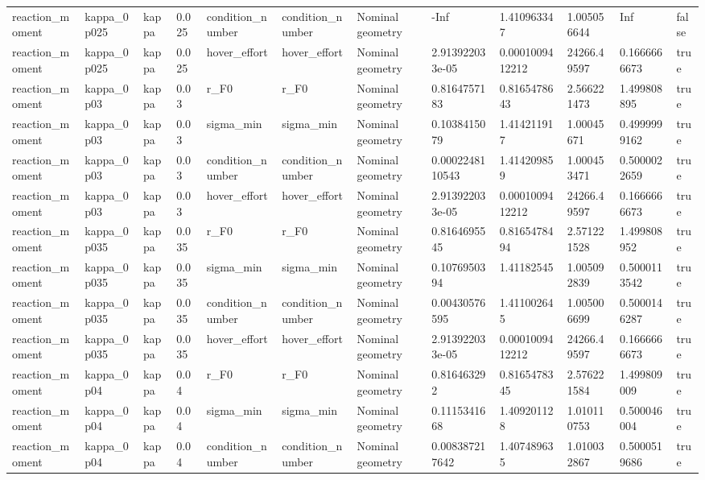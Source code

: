 \begin{tabular}{@{}llllllllllll@{}}
reaction\_moment & kappa\_0p025 & kappa & 0.025 & condition\_number & condition\_number & Nominal geometry & -Inf & 1.410963347 & 1.005056644 & Inf & false \\
reaction\_moment & kappa\_0p025 & kappa & 0.025 & hover\_effort & hover\_effort & Nominal geometry & 2.913922033e-05 & 0.0001009412212 & 24266.49597 & 0.1666666673 & true \\
reaction\_moment & kappa\_0p03 & kappa & 0.03 & r\_F0 & r\_F0 & Nominal geometry & 0.8164757183 & 0.8165478643 & 2.566221473 & 1.499808895 & true \\
reaction\_moment & kappa\_0p03 & kappa & 0.03 & sigma\_min & sigma\_min & Nominal geometry & 0.1038415079 & 1.414211917 & 1.00045671 & 0.4999999162 & true \\
reaction\_moment & kappa\_0p03 & kappa & 0.03 & condition\_number & condition\_number & Nominal geometry & 0.0002248110543 & 1.414209859 & 1.000453471 & 0.5000022659 & true \\
reaction\_moment & kappa\_0p03 & kappa & 0.03 & hover\_effort & hover\_effort & Nominal geometry & 2.913922033e-05 & 0.0001009412212 & 24266.49597 & 0.1666666673 & true \\
reaction\_moment & kappa\_0p035 & kappa & 0.035 & r\_F0 & r\_F0 & Nominal geometry & 0.8164695545 & 0.8165478494 & 2.571221528 & 1.499808952 & true \\
reaction\_moment & kappa\_0p035 & kappa & 0.035 & sigma\_min & sigma\_min & Nominal geometry & 0.1076950394 & 1.41182545 & 1.005092839 & 0.5000113542 & true \\
reaction\_moment & kappa\_0p035 & kappa & 0.035 & condition\_number & condition\_number & Nominal geometry & 0.00430576595 & 1.411002645 & 1.005006699 & 0.5000146287 & true \\
reaction\_moment & kappa\_0p035 & kappa & 0.035 & hover\_effort & hover\_effort & Nominal geometry & 2.913922033e-05 & 0.0001009412212 & 24266.49597 & 0.1666666673 & true \\
reaction\_moment & kappa\_0p04 & kappa & 0.04 & r\_F0 & r\_F0 & Nominal geometry & 0.816463292 & 0.8165478345 & 2.576221584 & 1.499809009 & true \\
reaction\_moment & kappa\_0p04 & kappa & 0.04 & sigma\_min & sigma\_min & Nominal geometry & 0.1115341668 & 1.409201128 & 1.010110753 & 0.500046004 & true \\
reaction\_moment & kappa\_0p04 & kappa & 0.04 & condition\_number & condition\_number & Nominal geometry & 0.008387217642 & 1.407489635 & 1.010032867 & 0.5000519686 & true \\

\end{tabular}
